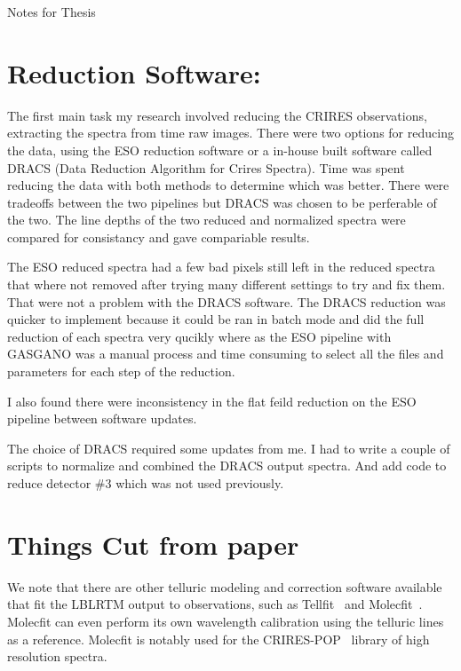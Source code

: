 Notes for Thesis

\section{Reduction Software:}

The first main task my research involved reducing the CRIRES observations, extracting the spectra from time raw images. There were two options for reducing the data, using the ESO reduction software or a in-house built software called DRACS (Data Reduction Algorithm for Crires Spectra). Time was spent reducing the data with both methods to determine which was better.
There were tradeoffs between the two pipelines but DRACS was chosen to be perferable of the two. The line depths of the two reduced and normalized spectra were compared for consistancy and gave compariable results.

The ESO reduced spectra had a few bad pixels still left in the reduced spectra that where not removed after trying many different settings to try and fix them.
That were not a problem with the DRACS software.
The DRACS reduction was quicker to implement because it could be ran in batch mode and did the full reduction of each spectra very qucikly where as the ESO pipeline with GASGANO was a manual process and time consuming to select all the files and parameters for each step of the reduction.

I also found there were inconsistency in the flat feild reduction on the ESO pipeline between software updates.

The choice of DRACS required some updates from me. I had to write a couple of scripts to normalize and combined the DRACS output spectra. And add code to reduce detector $\#3$ which was not used previously.




\section{Things Cut from paper}

We note that there are other telluric modeling and correction software available that fit the LBLRTM output to observations, such as Tellfit~\citep{gullikson_correcting_2014} and Molecfit~\citep{smette_molecfit:_2015}. Molecfit can even perform its own wavelength calibration using the telluric lines as a reference. Molecfit is notably used for the CRIRES-POP~\citep{nicholls_crires-pop:_2017} library of high resolution spectra.



